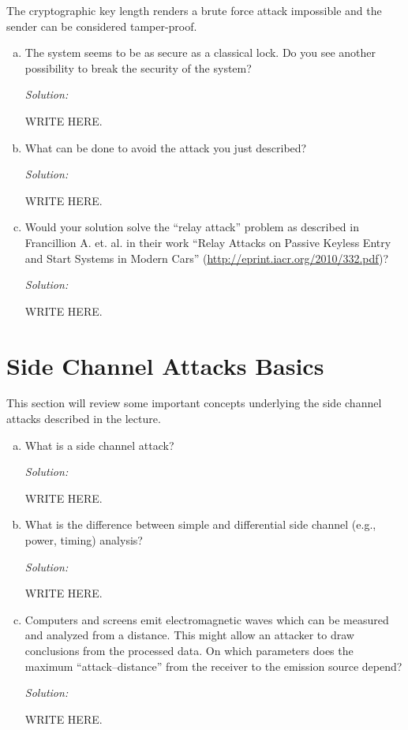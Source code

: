 \documentclass[a4paper,11pt]{article}
\newcommand{\includeonlyinsolution}[1]{\ifsolution#1\fi}
\newenvironment{solution}%
{\par{\noindent\small\textit{Solution:}}\vspace{-12pt}\begin{framed}}%
{\end{framed}\par}
\begin{document}
The cryptographic key length renders a brute force attack impossible and the sender
can be considered tamper-proof.
\begin{enumerate}[(a)]
\item The system seems to be as secure as a classical lock. Do you see another
possibility to break the security of the system?
\includeonlyinsolution{\begin{solution}
WRITE HERE.
\end{solution}}

\item What can be done to avoid the attack you just described?
\includeonlyinsolution{\begin{solution}
WRITE HERE.
\end{solution}}

\item Would your solution solve the ``relay attack'' problem as described in
  Francillion A. et. al. in their work ``Relay
  Attacks on Passive Keyless Entry and Start Systems in Modern Cars'' (\url{http://eprint.iacr.org/2010/332.pdf})?
\includeonlyinsolution{\begin{solution}
WRITE HERE.
\end{solution}}
\end{enumerate}

\section{Side Channel Attacks Basics}
This section will review some important concepts underlying the side channel
attacks described in the lecture. 
\begin{enumerate}[(a)]
\item What is a side channel attack?
\includeonlyinsolution{\begin{solution}
WRITE HERE.
\end{solution}}
\item What is the difference between simple and differential side channel
  (e.g., power, timing) analysis?
\includeonlyinsolution{\begin{solution}
WRITE HERE.
\end{solution}}

\item Computers and screens emit electromagnetic waves which can be measured and
analyzed from a distance. This might allow an attacker to draw conclusions from the
processed data. On which parameters does the maximum ``attack--distance'' from the
receiver to the emission source depend?
\includeonlyinsolution{\begin{solution}
WRITE HERE.
\end{solution}}


\end{enumerate}
\end{document}

